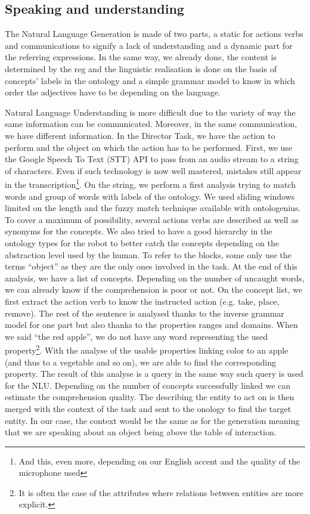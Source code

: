 \subsection{Speaking and understanding}

The Natural Language Generation is made of two parts, a static for actions verbs and communications to signify a lack of understanding and a dynamic part for the referring expressions. In the same way, we already done, the content is determined by the \acrshort{reg} and the linguistic realisation is done on the basis of concepts' labels in the ontology and a simple grammar model to know in which order the adjectives have to be depending on the language.

Natural Language Understanding is more difficult due to the variety of way the same information can be communicated. Moreover, in the same communication, we have different information. In the Director Task, we have the action to perform and the object on which the action has to be performed. First, we use the Google Speech To Text (STT) API to pass from an audio stream to a string of characters. Even if such technology is now well mastered, mistakes still appear in the transcription\footnote{And this, even more, depending on our English accent and the quality of the microphone used}. On the string, we perform a first analysis trying to match words and group of words with labels of the ontology. We used sliding windows limited on the length and the fuzzy match technique available with ontologenius. To cover a maximum of possibility, several actions verbs are described as well as synonyms for the concepts. We also tried to have a good hierarchy in the ontology types for the robot to better catch the concepts depending on the abstraction level used by the human. To refer to the blocks, some only use the terms ``object'' as they are the only ones involved in the task. At the end of this analysis, we have a list of concepts. Depending on the number of uncaught words, we can already know if the comprehension is poor or not. On the concept list, we first extract the action verb to know the instructed action (e.g. take, place, remove). The rest of the sentence is analysed thanks to the inverse grammar model for one part but also thanks to the properties ranges and domains. When we said ``the red apple'', we do not have any word representing the used property\footnote{It is often the case of the attributes where relations between entities are more explicit.}. With the analyse of the usable properties linking color to an apple (and thus to a vegetable and so on), we are able to find the corresponding property. The result of this analyse is a \sparql{} query in the same way such query is used for the NLU. Depending on the number of concepts successfully linked we can estimate the comprehension quality. The \sparql{} describing the entity to act on is then merged with the context of the task and sent to the onology to find the target entity. In our case, the context would be the same as for the generation meaning that we are speaking about an object being above the table of interaction.

